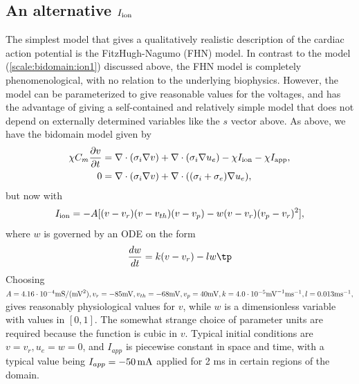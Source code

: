 \documentclass[graybox,envcountchap,sectrefs,final]{svmonodo}
\newcommand{\longinlinecomment}[3]{{\color{red}{\bf #1}: #2}}
\begin{document}


\subsection{An alternative $I_{\rm{ion}}$}
The simplest model that gives a qualitatively realistic description of
the cardiac action potential is the FitzHugh-Nagumo (FHN) model. In
contrast to the model (\ref{scale:bidomain:ion1}) discussed above, the
FHN model is completely phenomenological, with no relation to the
underlying biophysics. However, the model can be parameterized to give
reasonable values for the voltages, and has the advantage of giving a
self-contained and relatively simple model that does not depend on
externally determined variables like the $s$ vector above. As above,
we have the bidomain model given by
\begin{align}
\chi C_m\frac{\partial v}{\partial t} &=
\nabla\cdot( \sigma_i\nabla v) + \nabla\cdot (\sigma_i\nabla u_e) - \chi I_{\rm{ion}}
- \chi I_{\rm{app}},
\label{scale:bidomain:eqv2}\\ 
0 &= \nabla\cdot( \sigma_i\nabla v) + \nabla\cdot ((\sigma_i + \sigma_e)\nabla u_e),
\label{scale:bidomain:equ2}
\end{align}
but now with
\[ I_{\rm{ion}} = -A[(v-v_r)(v-v_{th})(v-v_p) - w(v-v_r)(v_p-v_r)^2], \]
where $w$ is governed by an ODE on the form
\[ \frac{dw}{dt} = k(v-v_r)-l w \tp\]
Choosing $A=4.16\cdot 10^{-4} \hbox{mS}/(\hbox{mV}^2),  v_r=-85\hbox{mV},
v_{th}= -68\hbox{mV}, v_p=40\hbox{mV}, k = 4.0\cdot10^{-5} \hbox{mV}^{-1}\hbox{ms}^{-1}, l
=0.013\hbox{ms}^{-1}, $ gives reasonably physiological values for $v$,
while $w$ is a dimensionless variable with values in $[0,1]$.
The somewhat strange choice of parameter units are
required because the function is cubic in $v$.
Typical initial conditions are $v=v_r, u_e = w=0$,
and $I_{app}$ is piecewise constant in space and time, with a typical
value being $I_{app} = -50\, \hbox{mA}$ applied for 2 ms in certain regions of
the domain.
\end{document}
